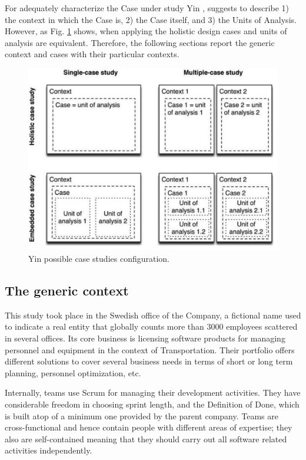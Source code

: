 For adequately characterize the Case under study Yin \cite{case_study_guide}, suggests to describe 1) the context in which the Case is, 2) the Case itself, and 3) the Units of Analysis. However, as Fig. \ref{fig:case-study-types} shows, when applying the holistic design cases and units of analysis are equivalent. Therefore, the following sections report the generic context and cases with their particular contexts.

\begin{figure}[hbt]
    \centering
    \includegraphics[width=\textwidth]{figure/yin-case-studies.pdf}
    \caption{Yin \cite{case_study_guide} possible case studies configuration.}
    \label{fig:case-study-types}
\end{figure}


\subsection{The generic context}

This study took place in the Swedish office of the Company, a fictional name used to indicate a real entity that globally counts more than 3000 employees scattered in several offices. Its core business is licensing software products for managing personnel and equipment in the context of Transportation. Their portfolio offers different solutions to cover several business needs in terms of short or long term planning, personnel optimization, etc.

Internally, teams use Scrum for managing their development activities. They have considerable freedom in choosing sprint length, and the Definition of Done, which is built atop of a minimum one provided by the parent company. Teams are cross-functional and hence contain people with different areas of expertise; they also are self-contained meaning that they should carry out all software related activities independently.

